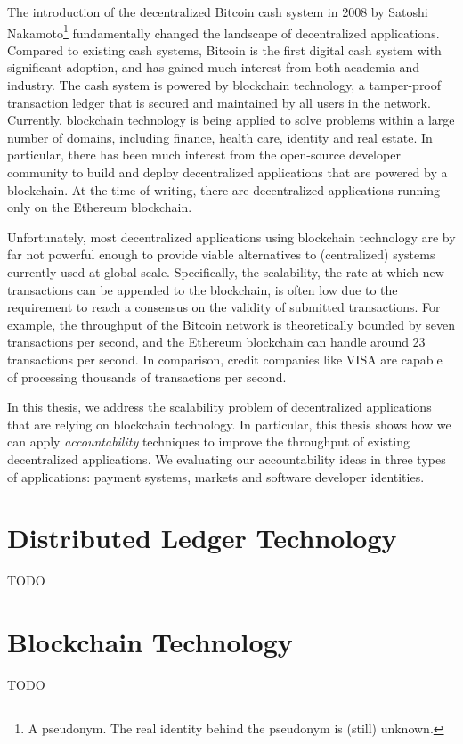The introduction of the decentralized Bitcoin cash system in 2008 by Satoshi Nakamoto\footnote{A pseudonym. The real identity behind the pseudonym is (still) unknown.} fundamentally changed the landscape of decentralized applications.
Compared to existing cash systems, Bitcoin is the first digital cash system with significant adoption, and has gained much interest from both academia and industry.
The cash system is powered by blockchain technology, a tamper-proof transaction ledger that is secured and maintained by all users in the network.
Currently, blockchain technology is being applied to solve problems within a large number of domains, including finance, health care, identity and real estate.
In particular, there has been much interest from the open-source developer community to build and deploy decentralized applications that are powered by a blockchain.
At the time of writing, there are  decentralized applications running only on the Ethereum blockchain.

Unfortunately, most decentralized applications using blockchain technology are by far not powerful enough to provide viable alternatives to (centralized) systems currently used at global scale.
Specifically, the scalability, the rate at which new transactions can be appended to the blockchain, is often low due to the requirement to reach a consensus on the validity of submitted transactions.
For example, the throughput of the Bitcoin network is theoretically bounded by seven transactions per second, and the Ethereum blockchain can handle around 23 transactions per second.
In comparison, credit companies like VISA are capable of processing thousands of transactions per second.


In this thesis, we address the scalability problem of decentralized applications that are relying on blockchain technology.
In particular, this thesis shows how we can apply \emph{accountability} techniques to improve the throughput of existing decentralized applications.
We evaluating our accountability ideas in three types of applications: payment systems, markets and software developer identities.

\section{Distributed Ledger Technology}
TODO

\section{Blockchain Technology}
TODO

